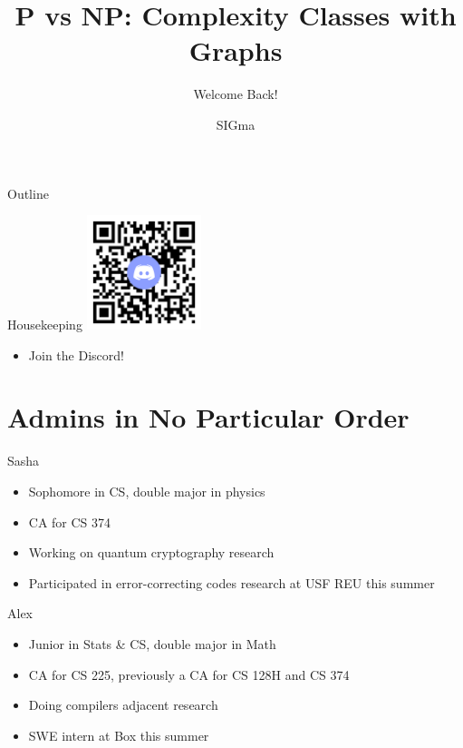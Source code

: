\documentclass[aspectratio=169, handout]{beamer}
\title{P vs NP: Complexity Classes with Graphs}
\subtitle{Welcome Back!}
\author{SIGma}
\date{}
\begin{document}

\begin{frame}
\titlepage
\end{frame}

\begin{frame}{Outline}
  \tableofcontents
\end{frame}


\begin{frame}{Housekeeping}
    \centering\includegraphics[width=0.25\textwidth]{qr-code.png}
    \begin{itemize}
        \item Join the Discord!
    \end{itemize}
\end{frame}


\section{Admins in No Particular Order}
\frame{\sectionpage}

\begin{frame}{Sasha}
    \begin{itemize}
        \item Sophomore in CS, double major in physics
        \item CA for CS 374
        \item Working on quantum cryptography research
        \item Participated in error-correcting codes research at USF REU this summer
    \end{itemize}
\end{frame}


\begin{frame}{Alex}
    \begin{itemize}
        \item Junior in Stats \& CS, double major in Math
        \item CA for CS 225, previously a CA for CS 128H and CS 374
        \item Doing compilers adjacent research
        \item SWE intern at Box this summer
    \end{itemize}
\end{frame}
\end{document}
